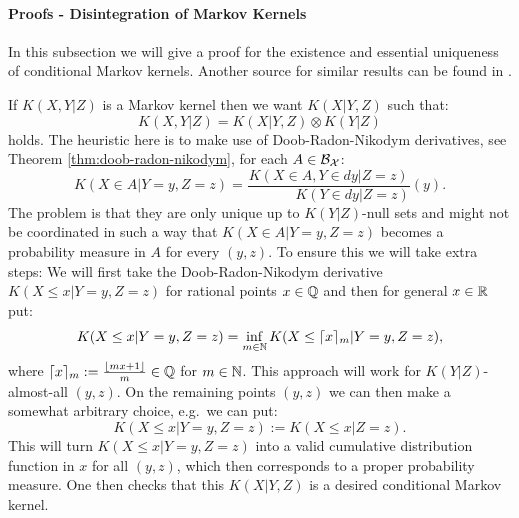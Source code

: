 \paragraph{Proofs - Disintegration of Markov Kernels}

In this subsection we will give a proof for the existence and essential uniqueness of conditional Markov kernels.
Another source for similar results can be found in \cite{Kal17}.


\begin{Rem}
    If $ K(X,Y|Z)$ is a Markov kernel then we want $ K(X|Y,Z)$ such that:
    \[ K(X,Y|Z) =  K(X|Y,Z) \otimes  K(Y|Z)\]
    holds. The heuristic here is to make use of Doob-Radon-Nikodym derivatives, see Theorem \ref{thm:doob-radon-nikodym}, 
    for each $A \in \mathcal{B}_{\mathcal{X}}$:
    \[  K(X \in A| Y=y,Z=z) = \frac{ K(X \in A,Y \in dy |Z=z)}{\phantom{X\in A,\,} K(Y \in dy|Z=z)}(y).  \]
    The problem is that they are only unique up to $K(Y|Z)$-null sets and might not be coordinated in such a way
    that $K(X \in A| Y=y,Z=z)$ becomes a probability measure in $A$ for every $(y,z)$. 
    To ensure this we will take extra steps: 
    We will first take the Doob-Radon-Nikodym derivative
    $K(X \le x| Y=y,Z=z)$ for rational points $x \in \mathbb{Q}$
    and then for general $x \in \mathbb{R}$ put:
    \[  K(X \le x| Y=y,Z=z) =
            \inf_{m \in \mathbb{N}} K(X \le \lceil x\rceil_m| Y=y,Z=z),
    \]
    where $ \lceil x\rceil_m:=\frac{\lfloor mx+1\rfloor}{m} \in \mathbb{Q}$ for $m \in \mathbb{N}$.
    This approach will work for $K(Y|Z)$-almost-all $(y,z)$.
    On the remaining points $(y,z)$  we can then make a somewhat arbitrary choice, e.g.\ we can put:
    \[ K(X \le x|Y=y,Z=z) :=  K(X\le x|Z=z).\]
    This will turn $K(X \le x|Y=y,Z=z)$ into a valid cumulative distribution function in $x$ for all $(y,z)$, 
    which then corresponds to a proper probability measure.
    One then checks that this $K(X|Y,Z)$ is a desired conditional Markov kernel.
\end{Rem}



